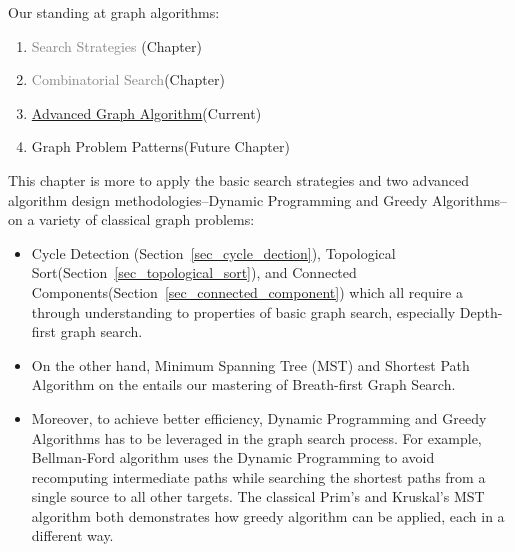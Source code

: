\documentclass[../main.tex]{subfiles}
\begin{document}
Our standing at graph algorithms:
\begin{enumerate}
    \item \textcolor{gray}{Search Strategies} (Chapter)
    \item \textcolor{gray}{Combinatorial Search}(Chapter)
    \item \underline{Advanced  Graph Algorithm}(Current)
    \item Graph Problem Patterns(Future Chapter)
\end{enumerate}
This chapter is more to apply the basic search strategies and two advanced algorithm design methodologies--Dynamic Programming and Greedy Algorithms-- on a variety of classical graph problems:  
\begin{itemize}
    \item Cycle Detection (Section~\ref{sec_cycle_dection}), Topological Sort(Section~\ref{sec_topological_sort}), and  Connected Components(Section~\ref{sec_connected_component}) which all require a through understanding to properties of basic graph search, especially Depth-first graph search. 
    \item On the other hand, Minimum Spanning Tree (MST) and Shortest Path Algorithm on the entails our mastering of Breath-first Graph Search. 
    \item Moreover, to achieve better efficiency, Dynamic Programming and Greedy Algorithms has to be leveraged in the graph search process. For example,  Bellman-Ford algorithm uses the Dynamic Programming to avoid recomputing intermediate paths while searching the shortest paths from a single source to all other targets. The classical Prim's and Kruskal's MST algorithm both demonstrates how greedy algorithm can be applied, each in a different way. 
\end{itemize} 
\end{document}
